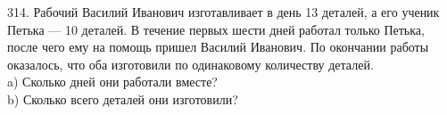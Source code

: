 314. Рабочий Василий Иванович изготавливает в день 13 деталей, а его ученик Петька --- 10 деталей. В течение первых шести дней работал только Петька, после чего ему на помощь пришел Василий Иванович. По окончании работы оказалось, что оба изготовили по одинаковому количеству деталей.\\
a) Сколько дней они работали вместе?\\
b) Сколько всего деталей они изготовили?\\
